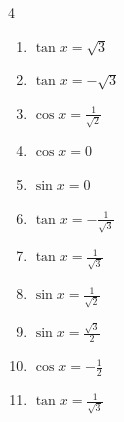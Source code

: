\begin{multicols}{4}
\begin{enumerate}
  \item $\displaystyle \tan{x}  = \sqrt{3}$


  \item $\displaystyle \tan{x}  = -\sqrt{3}$


  \item $\displaystyle \cos{x}  = \frac{1}{\sqrt{2}}$


  \item $\displaystyle \cos{x}  = 0$


  \item $\displaystyle \sin{x}  = 0$

        \phantom{$\displaystyle x = 0 , \pi$}

  \item $\displaystyle \tan{x}  = -\frac{1}{\sqrt{3}}$


  \item $\displaystyle \tan{x}  = \frac{1}{\sqrt{3}}$


  \item $\displaystyle \sin{x}  = \frac{1}{\sqrt{2}}$


  \item $\displaystyle \sin{x}  = \frac{\sqrt{3}}{2}$


  \item $\displaystyle \cos{x}  = -\frac{1}{2}$


  \item $\displaystyle \tan{x}  = \frac{1}{\sqrt{3}}$



\end{enumerate}
\end{multicols}
